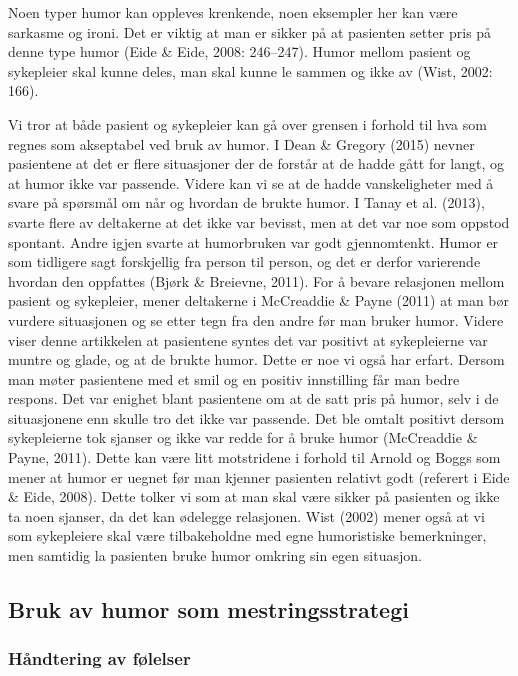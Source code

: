 Noen typer humor kan oppleves krenkende, noen eksempler her kan være sarkasme
og ironi. Det er viktig at man er sikker på at pasienten setter pris på denne
type humor (Eide \&{} Eide, 2008: 246--247). Humor mellom pasient og sykepleier
skal kunne deles, man skal kunne le sammen og ikke av (Wist, 2002: 166).

Vi tror at både pasient og sykepleier kan gå over grensen i forhold til hva som
regnes som akseptabel ved bruk av humor. I Dean \&{} Gregory (2015) nevner
pasientene at det er flere situasjoner der de forstår at de hadde gått for
langt, og at humor ikke var passende. Videre kan vi se at de hadde
vanskeligheter med å svare på spørsmål om når og hvordan de brukte humor. I
Tanay et al. (2013), svarte flere av deltakerne at det ikke var bevisst, men at
det var noe som oppstod spontant. Andre igjen svarte at humorbruken var godt
gjennomtenkt.  Humor er som tidligere sagt forskjellig fra person til person,
og det er derfor varierende hvordan den oppfattes (Bjørk \&{} Breievne, 2011). For
å bevare relasjonen mellom pasient og sykepleier, mener deltakerne i McCreaddie
\&{} Payne (2011) at man bør vurdere situasjonen og se etter tegn fra den andre
før man bruker humor. Videre viser denne artikkelen at pasientene syntes det
var positivt at sykepleierne var muntre og glade, og at de brukte humor. Dette
er noe vi også har erfart. Dersom man møter pasientene med et smil og en
positiv innstilling får man bedre respons. Det var enighet blant pasientene om
at de satt pris på humor, selv i de situasjonene enn skulle tro det ikke var
passende. Det ble omtalt positivt dersom sykepleierne tok sjanser og ikke var
redde for å bruke humor (McCreaddie \&{} Payne, 2011). Dette kan være litt
motstridene i forhold til Arnold og Boggs som mener at humor er uegnet før man
kjenner pasienten relativt godt (referert i Eide \&{} Eide, 2008). Dette tolker vi
som at man skal være sikker på pasienten og ikke ta noen sjanser, da det kan
ødelegge relasjonen. Wist (2002) mener også at vi som sykepleiere skal være
tilbakeholdne med egne humoristiske bemerkninger, men samtidig la pasienten
bruke humor omkring sin egen situasjon.

\subsection{Bruk av humor som mestringsstrategi}

\subsubsection{Håndtering av følelser}

